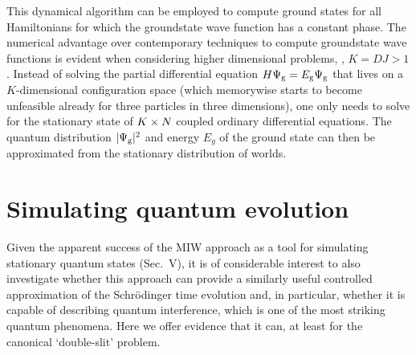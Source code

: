 \documentclass[twocolumn,aps,pra,amsmath,amssymb,superscriptaddress]{revtex4}
\newcommand{\ie}{{\em i.e.}}
\renewcommand{\(}{\left(}
\renewcommand{\)}{\right)}
\newcommand{\blk}{\color{black}}
\begin{document}
 This \blk dynamical algorithm can be employed to compute ground states 
for all Hamiltonians for which the groundstate wave function has a constant phase. 
\blk The numerical advantage over contemporary techniques to compute groundstate
wave functions is
evident when considering higher dimensional problems, \blk \ie, $K=DJ>1$.
Instead of solving the partial differential equation
$H\Psi_{\rm g}=E_{\rm g}\Psi_{\rm g}$ that lives on a 
$K$-dimensional \blk configuration space (which
memorywise starts to become unfeasible already for three particles in three
dimensions), one only needs to solve
for the stationary state of $K\times \blk N$ coupled ordinary differential equations. The
quantum distribution $|\Psi_{\rm g}|^2$ and energy $E_g$ \blk of the ground state can then be
approximated \blk from the stationary \blk distribution of worlds.



\section{Simulating quantum evolution}\label{sec:quantum-evolution}

Given the apparent success of the MIW approach as a tool for simulating
stationary quantum states (Sec.~V), it is of considerable interest to also
investigate whether this approach can  provide \blk a similarly useful
controlled approximation of the Schr\"odinger   time evolution and, in
particular, whether it is capable of describing quantum interference, which is
one of the most striking quantum phenomena. Here we offer evidence 
that it can, at least for the canonical  `double-slit' problem.   
\end{document}
